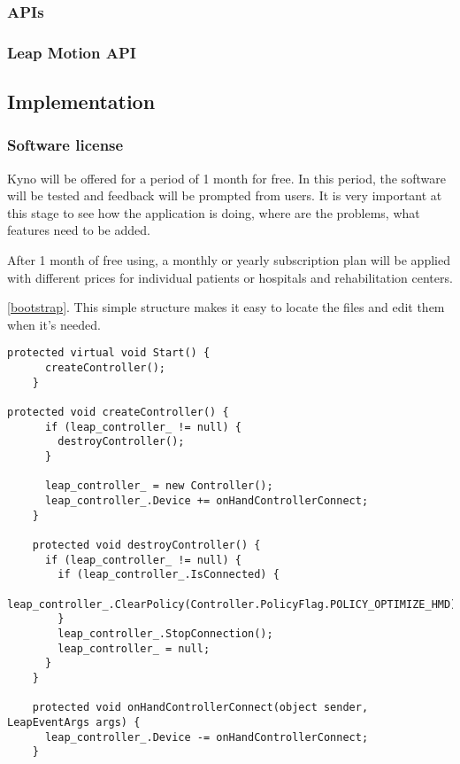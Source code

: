 \subsubsection{APIs}
\subsubsection{Leap Motion API}

\subsection{Implementation}
\subsubsection{Software license}
Kyno will be offered for a period of 1 month for free. In this period, the software will be tested and feedback will be prompted from users. It is very important at this stage to see how the application is doing, where are the problems, what features need to be added. 

After 1 month of free using, a monthly or yearly subscription plan will be applied with different prices for individual patients or hospitals and rehabilitation centers.

 \autoref{bootstrap}. This simple structure makes it easy to locate the files and edit them when it's needed.
\begin{lstlisting}[caption={Bootstrap folder structure},label={createController}]
  protected virtual void Start() {
      createController();
    }
    
protected void createController() {
      if (leap_controller_ != null) {
        destroyController();
      }

      leap_controller_ = new Controller();
      leap_controller_.Device += onHandControllerConnect;
    }
    
    protected void destroyController() {
      if (leap_controller_ != null) {
        if (leap_controller_.IsConnected) {
          leap_controller_.ClearPolicy(Controller.PolicyFlag.POLICY_OPTIMIZE_HMD);
        }
        leap_controller_.StopConnection();
        leap_controller_ = null;
      }
    }

    protected void onHandControllerConnect(object sender, LeapEventArgs args) {
      leap_controller_.Device -= onHandControllerConnect;
    }
\end{lstlisting}
\clearpage